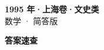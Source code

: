 \documentclass[zihao=-4, a4paper]{ctexart}
\begin{document}
\begin{center}
  {\Large\bfseries 1995 年·上海卷·文史类}\\[4pt]
  {\large 数学 · 简答版}
\end{center}
\medskip
{}

\clearpage
{}
\begin{center}{\Large\bfseries 答案速查}\end{center}
\medskip

\end{document}
